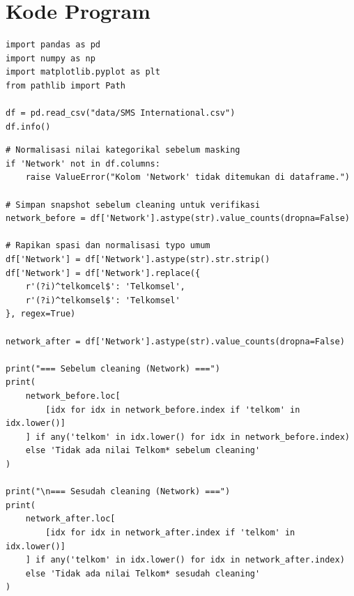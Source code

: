 %
%       
%

\section*{Kode Program}

\begin{lstlisting}[style=pycode,caption={Import pustaka dan load dataset}]
import pandas as pd
import numpy as np
import matplotlib.pyplot as plt
from pathlib import Path

df = pd.read_csv("data/SMS International.csv")
df.info()
\end{lstlisting}

\begin{lstlisting}[style=pycode,caption={Normalisasi kolom Network}]
# Normalisasi nilai kategorikal sebelum masking
if 'Network' not in df.columns:
    raise ValueError("Kolom 'Network' tidak ditemukan di dataframe.")

# Simpan snapshot sebelum cleaning untuk verifikasi
network_before = df['Network'].astype(str).value_counts(dropna=False)

# Rapikan spasi dan normalisasi typo umum
df['Network'] = df['Network'].astype(str).str.strip()
df['Network'] = df['Network'].replace({
    r'(?i)^telkomcel$': 'Telkomsel',
    r'(?i)^telkomsel$': 'Telkomsel'
}, regex=True)

network_after = df['Network'].astype(str).value_counts(dropna=False)

print("=== Sebelum cleaning (Network) ===")
print(
    network_before.loc[
        [idx for idx in network_before.index if 'telkom' in idx.lower()]
    ] if any('telkom' in idx.lower() for idx in network_before.index)
    else 'Tidak ada nilai Telkom* sebelum cleaning'
)

print("\n=== Sesudah cleaning (Network) ===")
print(
    network_after.loc[
        [idx for idx in network_after.index if 'telkom' in idx.lower()]
    ] if any('telkom' in idx.lower() for idx in network_after.index)
    else 'Tidak ada nilai Telkom* sesudah cleaning'
)
\end{lstlisting}

